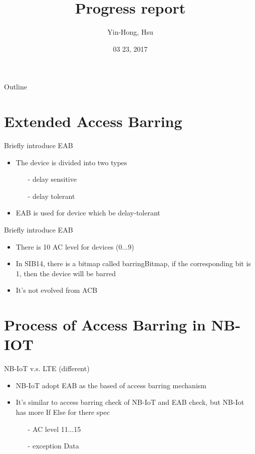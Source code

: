 \documentclass{beamer}
\title {
    Progress report
}
\author {
    Yin-Hong, Hsu
}
\date {
    03 23, 2017
}
\begin{document}
\begin{frame}
    \titlepage
\end{frame}


\begin{frame}{Outline}
    \tableofcontentsgather
    \tableofcontents
\end{frame}

\section{Extended Access Barring}

\begin{frame}{Briefly introduce EAB \cite{6489075}}
    \begin{itemize}
        \item {The device is divided into two types}
        \begin{itemize}    
            \item[-]{delay sensitive}
            \item[-]{delay tolerant}
        \end{itemize}
        \item {EAB is used for device which be delay-tolerant}
    \end{itemize}
\end{frame}

\begin{frame}{Briefly introduce EAB \cite{spec}}
    \begin{itemize}
        \item {There is 10 AC level for devices (0...9)}
        \item {In SIB14, there is a bitmap called barringBitmap, if the corresponding bit is 1, then the device will be barred}
        \item {It's not evolved from ACB}
    \end{itemize}
\end{frame}

\section{Process of Access Barring in NB-IOT}

\begin{frame}{NB-IoT v.s. LTE (different)}
    \begin{itemize}
        \item {NB-IoT adopt EAB as the based of access barring mechanism}
        \item {It's similar to access barring check of NB-IoT and EAB check, but NB-Iot has more If Else for there spec}
        \begin{itemize}    
            \item[-]{AC level 11...15}
            \item[-]{exception Data}
        \end{itemize}
    \end{itemize}
\end{frame}
\end{document}
